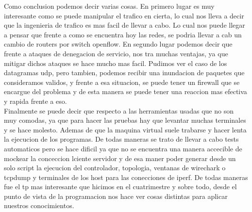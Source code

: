 Como conclusion podemos decir varias cosas. En primero lugar es muy interesante como se puede manipular el trafico en cierta, lo cual nos lleva a decir que la ingenieria de trafico es mas facil de llevar a cabo. Lo cual nos puede llegar a pensar que frente a como se encuentra hoy las redes, se podria llevar a cab un cambio de routers por switch openflow. En segundo lugar podemos decir que frente a ataques de denegacion de servicio, nos tra muchas ventajas, ya que mitigar dichos ataques se hace mucho mas facil. Pudimos ver el caso de los datagramas udp, pero tambien, podemos recibir una inundacion de paquetes que consideramos validos, y frente a esa situacion, se puede tener un firewall que se encargue del problema y de esta manera se puede tener una reaccion mas efectiva y rapida frente a eso.\\
Finalmente se puede decir que respecto a las herramientas usadas que no son muy comodas, ya que para hacer las pruebas hay que levantar muchas terminales y se hace molesto. Ademas de que la maquina virtual suele trabarse y hacer lenta la ejecucion de los programas. De todas maneras se trato de llevar a cabo tests automaticos pero se hace dificil ya que no se encuentra una manera accecible de mockear la conceccion lciente servidor y de esa maner poder generar desde un solo script la ejecucion del controlador, topologia, ventanas de wirechark o tcpdump y terminales de los host para las conecciones de iperf. De todas maneras fue el tp mas interesante que hicimos en el cuatrimestre y sobre todo, desde el punto de vista de la programacion nos hace ver cosas distintas para aplicar nuestros conocimientos.
